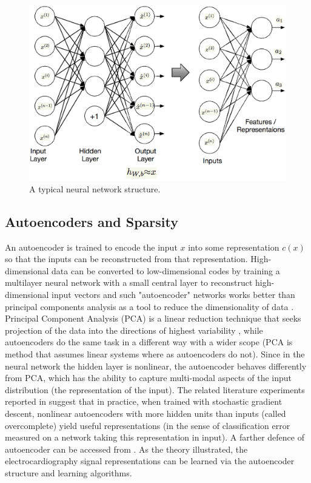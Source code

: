 \documentclass[graybox]{svmult}
\begin{document}
%
\begin{figure}[t]
\sidecaption
\includegraphics[scale=.5]{nnstructure}
%
%
\caption{A typical neural network structure.}
\label{fig:3}       %
\end{figure}



\subsection{Autoencoders and Sparsity}
An autoencoder is trained to encode the input $x$ into some representation $c(x)$ so that the inputs can be reconstructed from that representation. High-dimensional data can be converted to low-dimensional codes by training a multilayer neural network with a small central layer to reconstruct high-dimensional input vectors and such "autoencoder" networks works better than principal components analysis as a tool to reduce the dimensionality of data \cite{hinton2006reducing}. Principal Component Analysis (PCA) is a linear reduction technique that seeks projection of the data into the directions of highest variability \cite{duda2012pattern}, while autoencoders do the same task in a different way with a wider scope (PCA is method that assumes linear systems where as autoencoders do not). Since in the neural network the hidden layer is nonlinear, the autoencoder behaves differently from PCA, which has the ability to capture multi-modal aspects of the input distribution (the representation of the input). The related literature experiments reported in \cite{bengio2007greedy} suggest that in practice, when trained with stochastic gradient descent, nonlinear autoencoders with more hidden units than inputs (called overcomplete) yield useful representations (in the sense of classification error measured on a network taking this representation in input). A farther defence of autoencoder can be accessed from \cite{bengio2009learning}. As the theory illustrated, the electrocardiography signal representations can be learned via the autoencoder structure and learning algorithms.
\end{document}
